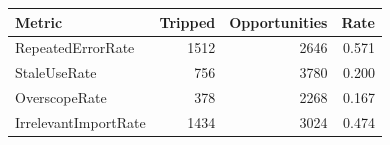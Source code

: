 \begin{tabular}{lrrr}
\toprule
Metric & Tripped & Opportunities & Rate \\
\midrule
RepeatedErrorRate & 1512 & 2646 & 0.571 \\
StaleUseRate & 756 & 3780 & 0.200 \\
OverscopeRate & 378 & 2268 & 0.167 \\
IrrelevantImportRate & 1434 & 3024 & 0.474 \\
\bottomrule
\end{tabular}
